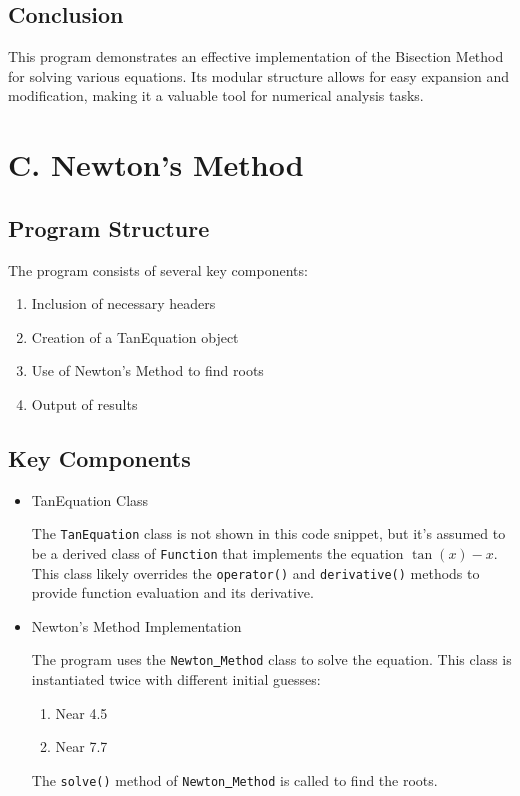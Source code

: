 \documentclass{article}
\begin{document}
\subsection{Conclusion}
This program demonstrates an effective implementation of the Bisection Method for solving various equations. Its modular structure allows for easy expansion and modification, making it a valuable tool for numerical analysis tasks.

\section{C. Newton’s Method}
\subsection{Program Structure}
The program consists of several key components:
\begin{enumerate}
\item Inclusion of necessary headers
\item Creation of a TanEquation object
\item Use of Newton's Method to find roots
\item Output of results
\end{enumerate}

\subsection{Key Components}
\begin{itemize}
\item{TanEquation Class}\par
The \texttt{TanEquation} class is not shown in this code snippet, but it's assumed to be a derived class of \texttt{Function} that implements the equation $\tan(x) - x$. This class likely overrides the \texttt{operator()} and \texttt{derivative()} methods to provide function evaluation and its derivative.
\item{Newton's Method Implementation}\par
The program uses the \texttt{Newton\underline{~}Method} class to solve the equation. This class is instantiated twice with different initial guesses:
\begin{enumerate}
\item Near 4.5
\item Near 7.7
\end{enumerate}
The \texttt{solve()} method of \texttt{Newton\underline{~}Method} is called to find the roots.
\end{itemize}
\end{document}
